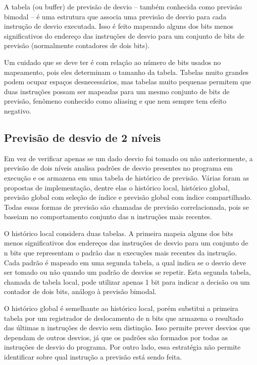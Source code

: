 \documentclass[12pt]{article}
\begin{document}
  A tabela (ou buffer) de previsão de desvio -- também conhecida como previsão bimodal -- é uma estrutura que associa uma previsão de desvio para cada instrução
  de desvio executada. Isso é feito mapeando alguns dos bits menos significativos do endereço das instruções de desvio para um conjunto de bits de
  previsão (normalmente contadores de dois bits).
  
  Um cuidado que se deve ter é com relação ao número de bits usados no mapeamento, pois eles determinam o tamanho da tabela. Tabelas muito grandes podem ocupar
  espaços desnecessários, mas tabelas muito pequenas permitem que duas instruções possam ser mapeadas para um mesmo conjunto de bits de previsão, fenômeno
  conhecido como aliasing e que nem sempre tem efeito negativo\cite{benlee}.
  
  \subsection{Previsão de desvio de 2 níveis}
  
  Em vez de verificar apenas se um dado desvio foi tomado ou não anteriormente, a previsão de dois níveis analisa padrões de desvio presentes no programa em
  execução e os armazena em uma tabela de histórico de previsão. Várias foram as propostas de implementação, dentre elas o histórico local, histórico global,
  previsão global com seleção de índice e previsão global com índice compartilhado. Todas essas formas de previsão são chamadas de previsão
  correlacionada\cite{schemes}, pois se baseiam no comportamento conjunto das n instruções mais recentes.
  
  O histórico local considera duas tabelas. A primeira mapeia alguns dos bits menos significativos dos endereços das instruções de desvio para um conjunto de n
  bits que representam o padrão das n execuções mais recentes da instrução. Cada padrão é mapeado em uma segunda tabela, a qual indica se o desvio deve ser
  tomado ou não quando um padrão de desvios se repetir. Esta segunda tabela, chamada de tabela local, pode utilizar apenas 1 bit para indicar a
  decisão\cite{yehpatt} ou um contador de dois bits\cite{smith}, análogo à previsão bimodal.
  
  O histórico global é semelhante ao histórico local, porém substitui a primeira tabela por um registrador de deslocamento de n bits que armazena o resultado
  das últimas n instruções de desvio sem distinção. Isso permite prever desvios que dependam de outros desvios, já que os padrões são
  formados por todas as instruções de desvio do programa\cite{mcfarling}. Por outro lado, essa estratégia não permite identificar sobre qual instrução a
  previsão está sendo feita.
  
\end{document}
